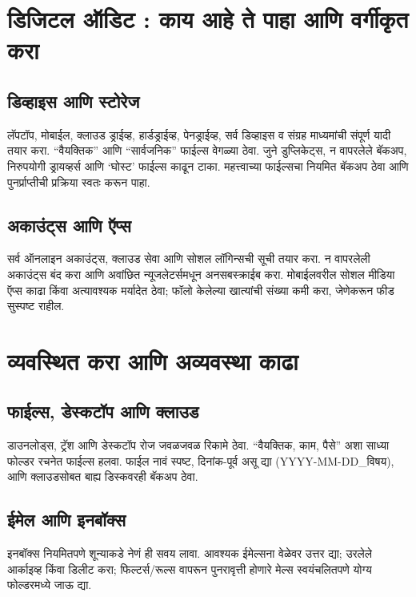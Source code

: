 \section*{डिजिटल ऑडिट : काय आहे ते पाहा आणि वर्गीकृत करा}

\subsection*{डिव्हाइस आणि स्टोरेज}

लॅपटॉप, मोबाईल, क्लाउड ड्राईव्ह, हार्डड्राईव्ह, पेनड्राईव्ह, सर्व डिव्हाइस व संग्रह माध्यमांची संपूर्ण यादी तयार करा. “वैयक्तिक” आणि “सार्वजनिक” फाईल्स वेगळ्या ठेवा. जुने डुप्लिकेट्स, न वापरलेले बॅकअप, निरुपयोगी ड्रायव्हर्स आणि ‘घोस्ट’ फाईल्स काढून टाका. महत्त्वाच्या फाईल्सचा नियमित बॅकअप ठेवा आणि पुनर्प्राप्तीची प्रक्रिया स्वतः करून पाहा.

\subsection*{अकाउंट्स आणि ऍप्स}

सर्व ऑनलाइन अकाउंट्स, क्लाउड सेवा आणि सोशल लॉगिन्सची सूची तयार करा. न वापरलेली अकाउंट्स बंद करा आणि अवांछित न्यूजलेटर्समधून अनसबस्क्राईब करा. मोबाईलवरील सोशल मीडिया ऍप्स काढा किंवा अत्यावश्यक मर्यादेत ठेवा; फॉलो केलेल्या खात्यांची संख्या कमी करा, जेणेकरून फीड सुस्पष्ट राहील.

\section*{व्यवस्थित करा आणि अव्यवस्था काढा}

\subsection*{फाईल्स, डेस्कटॉप आणि क्लाउड}

डाउनलोड्स, ट्रॅश आणि डेस्कटॉप रोज जवळजवळ रिकामे ठेवा. “वैयक्तिक, काम, पैसे” अशा साध्या फोल्डर रचनेत फाईल्स हलवा. फाईल नावं स्पष्ट, दिनांक-पूर्व असू द्या (YYYY-MM-DD\_विषय), आणि क्लाउडसोबत बाह्य डिस्कवरही बॅकअप ठेवा.

\subsection*{ईमेल आणि इनबॉक्स}

इनबॉक्स नियमितपणे शून्याकडे नेणं ही सवय लावा. आवश्यक ईमेल्सना वेळेवर उत्तर द्या; उरलेले आर्काइव्ह किंवा डिलीट करा; फिल्टर्स/रूल्स वापरून पुनरावृत्ती होणारे मेल्स स्वयंचलितपणे योग्य फोल्डरमध्ये जाऊ द्या.

